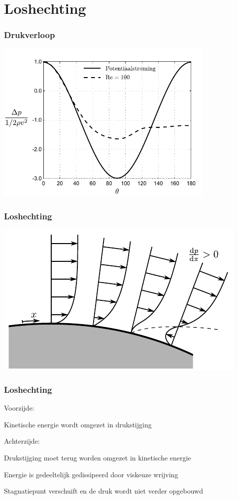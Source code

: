 \documentclass[t]{beamer}
\begin{document}
	\section{Loshechting}
	\begin{frame}
		\frametitle{Drukverloop}
		\pause
		\center
		\includegraphics[width=0.8\textwidth]{fig/uitwendige_stroming/Cilinderstroming_drukverloop}
  	\end{frame}
  	\begin{frame}
		\frametitle{Loshechting}
		\pause
		\center
		\includegraphics{fig/uitwendige_stroming/loshechting}
  	\end{frame}
  	\begin{frame}
		\frametitle{Loshechting}
		Voorzijde:
		\begin{center}
			Kinetische energie wordt omgezet in drukstijging
		\end{center}
		
		\vspace{0.5cm}
		\pause
		Achterzijde:
		\begin{center}
			Drukstijging moet terug worden omgezet in kinetische energie
			
			\vspace{0.5cm}
			\pause
			Energie is gedeeltelijk gedissipeerd door viskeuze wrijving
			
			\vspace{0.5cm}
			\pause
			Stagnatiepunt verschuift en de druk wordt niet verder opgebouwd
		\end{center}
  	\end{frame}
\end{document}
